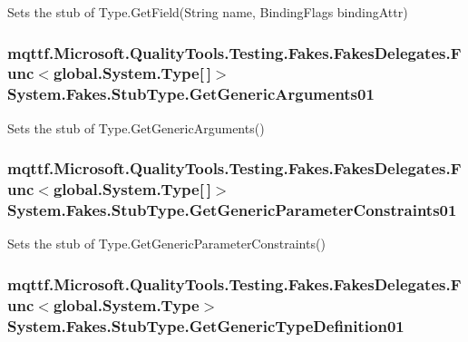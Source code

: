 Sets the stub of Type.\-Get\-Field(\-String name, Binding\-Flags binding\-Attr)

\hypertarget{class_system_1_1_fakes_1_1_stub_type_a206fe27c0d105d414a1398cf8f1826f7}{
\subsubsection[{Get\-Generic\-Arguments01}]{\setlength{\rightskip}{0pt plus 5cm}mqttf.\-Microsoft.\-Quality\-Tools.\-Testing.\-Fakes.\-Fakes\-Delegates.\-Func$<$global.\-System.\-Type\mbox{[}$\,$\mbox{]}$>$ System.\-Fakes.\-Stub\-Type.\-Get\-Generic\-Arguments01}}\label{class_system_1_1_fakes_1_1_stub_type_a206fe27c0d105d414a1398cf8f1826f7}


Sets the stub of Type.\-Get\-Generic\-Arguments()

\hypertarget{class_system_1_1_fakes_1_1_stub_type_aa9ccf0d88e7c69d67b28e2e76edf1d6f}{
\subsubsection[{Get\-Generic\-Parameter\-Constraints01}]{\setlength{\rightskip}{0pt plus 5cm}mqttf.\-Microsoft.\-Quality\-Tools.\-Testing.\-Fakes.\-Fakes\-Delegates.\-Func$<$global.\-System.\-Type\mbox{[}$\,$\mbox{]}$>$ System.\-Fakes.\-Stub\-Type.\-Get\-Generic\-Parameter\-Constraints01}}\label{class_system_1_1_fakes_1_1_stub_type_aa9ccf0d88e7c69d67b28e2e76edf1d6f}


Sets the stub of Type.\-Get\-Generic\-Parameter\-Constraints()

\hypertarget{class_system_1_1_fakes_1_1_stub_type_a33c8ddf5eb7be3b1f0f910fd28630b23}{
\subsubsection[{Get\-Generic\-Type\-Definition01}]{\setlength{\rightskip}{0pt plus 5cm}mqttf.\-Microsoft.\-Quality\-Tools.\-Testing.\-Fakes.\-Fakes\-Delegates.\-Func$<$global.\-System.\-Type$>$ System.\-Fakes.\-Stub\-Type.\-Get\-Generic\-Type\-Definition01}}\label{class_system_1_1_fakes_1_1_stub_type_a33c8ddf5eb7be3b1f0f910fd28630b23}


